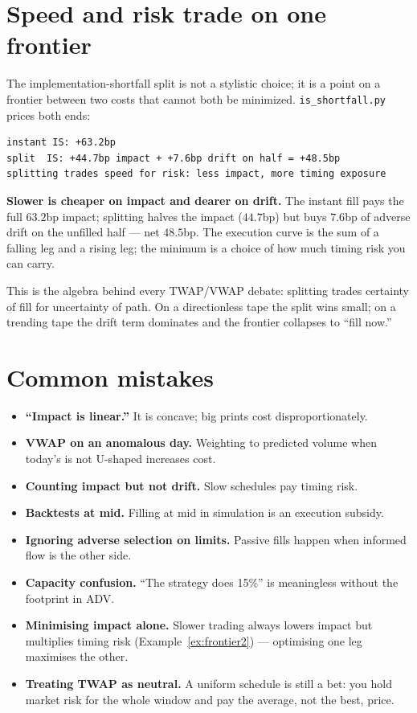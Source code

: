 \section{Speed and risk trade on one frontier}\label{sec:frontier2}
The implementation-shortfall split is not a stylistic choice;
it is a point on a frontier between two costs that cannot both
be minimized. \texttt{is\_shortfall.py} prices both ends:
\begin{verbatim}
instant IS: +63.2bp
split  IS: +44.7bp impact + +7.6bp drift on half = +48.5bp
splitting trades speed for risk: less impact, more timing exposure
\end{verbatim}
\begin{example}\label{ex:frontier2}
\textbf{Slower is cheaper on impact and dearer on drift.} The
instant fill pays the full $63.2$bp impact; splitting halves
the impact ($44.7$bp) but buys $7.6$bp of adverse drift on the
unfilled half --- net $48.5$bp. The execution curve is the
sum of a falling leg and a rising leg; the minimum is a choice
of how much timing risk you can carry.
\begin{solution}
This is the algebra behind every TWAP/VWAP debate: splitting
trades certainty of fill for uncertainty of path. On a
directionless tape the split wins small; on a trending tape the
drift term dominates and the frontier collapses to
``fill now.''
\end{solution}
\end{example}
\section{Common mistakes}
\begin{itemize}
\item \textbf{``Impact is linear.''} It is concave; big prints cost disproportionately.
\item \textbf{VWAP on an anomalous day.} Weighting to predicted volume when today's is not
  U-shaped increases cost.
\item \textbf{Counting impact but not drift.} Slow schedules pay timing risk.
\item \textbf{Backtests at mid.} Filling at mid in simulation is an execution subsidy.
\item \textbf{Ignoring adverse selection on limits.} Passive fills happen when informed
  flow is the other side.
\item \textbf{Capacity confusion.} ``The strategy does 15\%'' is meaningless without the
  footprint in ADV.
\item \textbf{Minimising impact alone.} Slower trading
always lowers impact but multiplies timing risk
(Example~\ref{ex:frontier2}) --- optimising one leg maximises the
other.
\item \textbf{Treating TWAP as neutral.} A uniform schedule is
still a bet: you hold market risk for the whole window and pay
the average, not the best, price.
\end{itemize}

